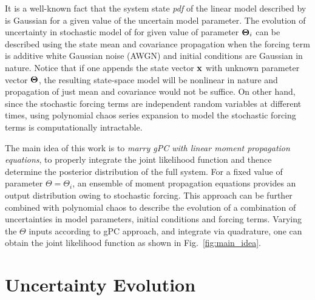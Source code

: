 \documentclass[10pt, conference]{IEEEtran}
\begin{document}
It is a well-known fact that the system state \textit{pdf} of the linear model described by  is Gaussian for a given value of the uncertain model parameter. The evolution of uncertainty in stochastic model of  for given value of parameter $\boldsymbol{\Theta}_i$ can be described using the state mean and covariance propagation when the forcing term is additive white Gaussian noise (AWGN) and initial conditions are Gaussian in nature. Notice that if one appends the state vector $\mathbf{x}$ with unknown parameter vector $\boldsymbol{\Theta}$, the resulting state-space model will be nonlinear in nature and propagation of just mean and covariance would not be suffice. On other hand, since the stochastic forcing terms are independent random variables at different times, using polynomial chaos series expansion to model the stochastic forcing terms is computationally intractable.

The main idea of this work is to \textit{marry gPC with linear moment propagation equations}, to properly integrate the joint likelihood function and thence determine the posterior distribution of the full system.  For a fixed value of parameter $\Theta=\Theta_i$, an ensemble of moment propagation equations provides an output distribution owing to stochastic forcing.  This approach can be further combined with polynomial chaos to describe the evolution of a combination of uncertainties in model parameters, initial conditions and forcing terms. Varying the $\Theta$ inputs according to gPC approach, and integrate via quadrature, one can obtain the joint likelihood function as shown in Fig.~\ref{fig:main_idea}.

\section{Uncertainty Evolution}
\end{document}
